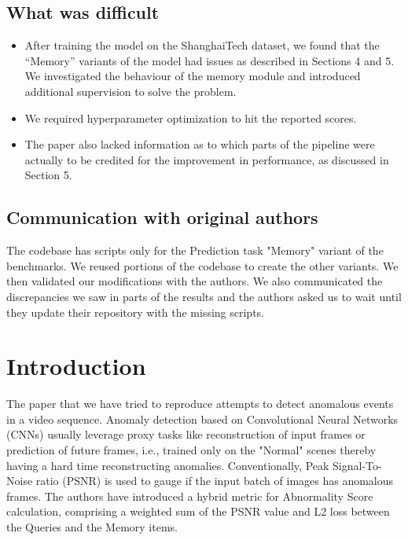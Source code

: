 \subsection*{What was difficult}

\begin{itemize}
    \item After training the model on the ShanghaiTech dataset\cite{Luo2017ARO}, we found that the “Memory” variants of the model had issues as described in Sections 4 and 5. We investigated the behaviour of the memory module and introduced additional supervision to solve the problem. 
    \item We required hyperparameter optimization to hit the reported scores. 
    \item The paper also lacked information as to which parts of the pipeline were actually to be credited for the improvement in performance, as discussed in Section 5.

\end{itemize}

\subsection*{Communication with original authors}

The codebase has scripts only for the Prediction task "Memory" variant of the benchmarks. We reused portions of the codebase to create the other variants. We then validated our modifications with the authors. We also communicated the discrepancies we saw in parts of the results and the authors asked us to wait until they update their repository with the missing scripts.


\section{Introduction}
The paper that we have tried to reproduce attempts to detect anomalous events in a video sequence. Anomaly detection based on Convolutional Neural Networks (CNNs) usually leverage proxy tasks like reconstruction of input frames or prediction of future frames, i.e., trained only on the "Normal" scenes thereby having a hard time reconstructing anomalies. Conventionally, Peak Signal-To-Noise ratio (PSNR) is used to gauge if the input batch of images has anomalous frames. The authors have introduced a hybrid metric for Abnormality Score calculation, comprising a weighted sum of the PSNR value and L2 loss between the Queries and the Memory items.

